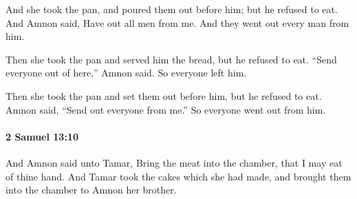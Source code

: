 			\begin{versebox}
					\item[BHS] 
					\item[ASV] And she took the pan, and poured them out before him; but he refused to eat. And Amnon said, Have out all men from me. And they went out every man from him.
					\item[NIV] Then she took the pan and served him the bread, but he refused to eat. “Send everyone out of here,” Amnon said. So everyone left him.
					\item[NRSV] Then she took the pan and set them out before him, but he refused to eat. Amnon said, “Send out everyone from me.” So everyone went out from him.
			\end{versebox}

		\paragraph{2 Samuel 13:10} %
			\label{2SAMUEL-13-10}

			And Amnon said unto Tamar, Bring the meat into the chamber, that I may eat of thine hand. And Tamar took the cakes which she had made, and brought them into the chamber to Amnon her brother.

